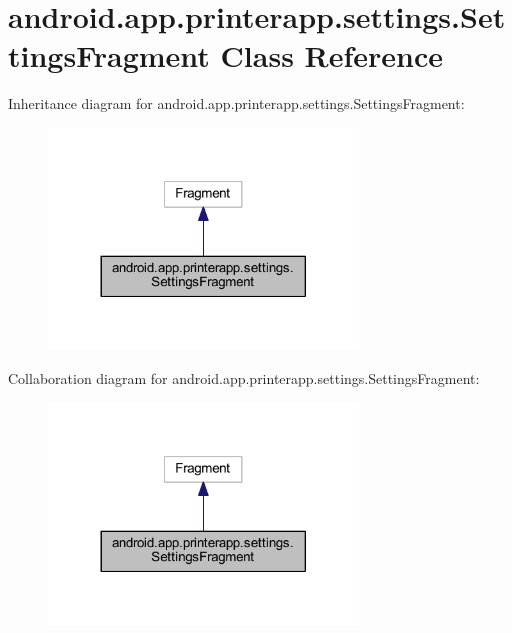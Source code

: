 \hypertarget{classandroid_1_1app_1_1printerapp_1_1settings_1_1_settings_fragment}{}\section{android.\+app.\+printerapp.\+settings.\+Settings\+Fragment Class Reference}
\label{classandroid_1_1app_1_1printerapp_1_1settings_1_1_settings_fragment}


Inheritance diagram for android.\+app.\+printerapp.\+settings.\+Settings\+Fragment\+:
\nopagebreak
\begin{figure}[H]
\begin{center}
\leavevmode
\includegraphics[width=233pt]{classandroid_1_1app_1_1printerapp_1_1settings_1_1_settings_fragment__inherit__graph}
\end{center}
\end{figure}


Collaboration diagram for android.\+app.\+printerapp.\+settings.\+Settings\+Fragment\+:
\nopagebreak
\begin{figure}[H]
\begin{center}
\leavevmode
\includegraphics[width=233pt]{classandroid_1_1app_1_1printerapp_1_1settings_1_1_settings_fragment__coll__graph}
\end{center}
\end{figure}
